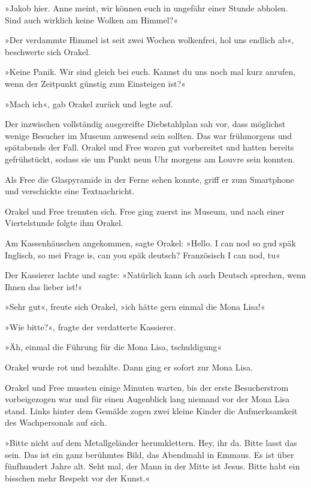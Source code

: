 »Jakob hier. Anne meint, wir können euch in ungefähr einer Stunde abholen. Sind auch wirklich keine Wolken am Himmel?«

»Der verdammte Himmel ist seit zwei Wochen wolkenfrei, hol uns endlich ab«, beschwerte sich Orakel.

»Keine Panik. Wir sind gleich bei euch. Kannst du uns noch mal kurz anrufen, wenn der Zeitpunkt günstig zum Einsteigen ist?«

»Mach ich«, gab Orakel zurück und legte auf.

Der inzwischen vollständig ausgereifte Diebstahlplan sah vor, dass möglichst wenige Besucher im Museum anwesend sein sollten. Das war frühmorgens und spätabends der Fall. Orakel und Free waren gut vorbereitet und hatten bereits gefrühstückt, sodass sie um Punkt neun Uhr morgens am Louvre sein konnten.

Als Free die Glaspyramide in der Ferne sehen konnte, griff er zum Smartphone und verschickte eine Textnachricht.


Orakel und Free trennten sich. Free ging zuerst ins Museum, und nach einer Viertelstunde folgte ihm Orakel.

Am Kassenhäuschen angekommen, sagte Orakel: »Hello. I can nod so gud späk Inglisch, so mei Frage is, can you späk deutsch? Französisch I can nod, tu«

Der Kassierer lachte und sagte: »Natürlich kann ich auch Deutsch sprechen, wenn Ihnen das lieber ist!«

»Sehr gut«, freute sich Orakel, »ich hätte gern einmal die Mona Lisa!«

»Wie bitte?«, fragte der verdatterte Kassierer.

»Äh, einmal die Führung für die Mona Lisa, tschuldigung«

Orakel wurde rot und bezahlte. Dann ging er sofort zur Mona Lisa.

Orakel und Free mussten einige Minuten warten, bis der erste Besucherstrom vorbeigezogen war und für einen Augenblick lang niemand vor der Mona Lisa stand. Links hinter dem Gemälde zogen zwei kleine Kinder die Aufmerksamkeit des Wachpersonals auf sich.

»Bitte nicht auf dem Metallgeländer herumklettern. Hey, ihr da. Bitte lasst das sein. Das ist ein ganz berühmtes Bild, das Abendmahl in Emmaus. Es ist über fünfhundert Jahre alt. Seht mal, der Mann in der Mitte ist Jesus. Bitte habt ein bisschen mehr Respekt vor der Kunst.«

